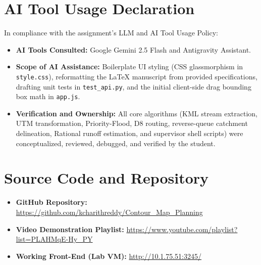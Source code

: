 \documentclass[manuscript,screen,review]{acmart}
\begin{document}
\section{AI Tool Usage Declaration}
\label{sec:ai-usage}
In compliance with the assignment's LLM and AI Tool Usage Policy:
\begin{itemize}
    \item \textbf{AI Tools Consulted:} Google Gemini 2.5 Flash and Antigravity Assistant.
    \item \textbf{Scope of AI Assistance:} Boilerplate UI styling (CSS glassmorphism in \texttt{style.css}), reformatting the LaTeX manuscript from provided specifications, drafting unit tests in \texttt{test\_api.py}, and the initial client-side drag bounding box math in \texttt{app.js}.
    \item \textbf{Verification and Ownership:} All core algorithms (KML stream extraction, UTM transformation, Priority-Flood, D8 routing, reverse-queue catchment delineation, Rational runoff estimation, and supervisor shell scripts) were conceptualized, reviewed, debugged, and verified by the student.
\end{itemize}

\appendix

\section{Source Code and Repository}
\begin{itemize}
    \item \textbf{GitHub Repository:} \url{https://github.com/kcharithreddy/Contour_Map_Planning}
    \item \textbf{Video Demonstration Playlist:} \url{https://www.youtube.com/playlist?list=PLAHMqE-Hy_PY}
    \item \textbf{Working Front-End (Lab VM):} \url{http://10.1.75.51:3245/}
\end{itemize}
\end{document}
